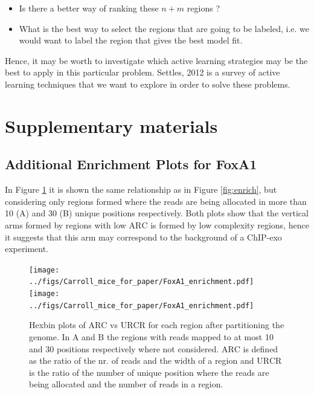 \documentclass[11pt]{article}\usepackage[]{graphicx}\usepackage[]{color}
\begin{document}
\begin{itemize}
\item Is there a better way of ranking these $n+m$ regions ?
\item What is the best way to select the regions that are going to be
  labeled, i.e. we would want to label the region that gives the
  best model fit.
\end{itemize}

Hence, it may be worth to investigate which active learning strategies
may be the best to apply in this particular problem. Settles, 2012
\cite{al} is a survey of active learning techniques that we want to
explore in order to solve these problems.

\newpage


\nocite{exo_review}
\nocite{exo_gb}
\nocite{maplot1}
\nocite{maplot2}
\nocite{esl}
\nocite{anp}
\nocite{al}
\nocite{oc_review}
\nocite{exo4}

\newpage

\section*{Supplementary materials}
\label{sec:supp}

\subsection*{Additional Enrichment Plots for FoxA1}
\label{sec:enrichsup}

In Figure \ref{fig:enrich2} it is shown the same relationship as in
Figure \ref{fig:enrich}, but considering only regions formed where the
reads are being allocated in more than 10 (A) and 30 (B) unique
positions respectively. Both plots show that the vertical arms formed
by regions with low $\mbox{ARC}$ is formed by low complexity regions,
hence it suggests that this arm may correspond to the background of a
ChIP-exo experiment.

\begin{figure}[h!]
  \centering
  \texttt{[image: ../figs/Carroll\_mice\_for\_paper/FoxA1\_enrichment.pdf]}
  \texttt{[image: ../figs/Carroll\_mice\_for\_paper/FoxA1\_enrichment.pdf]}
  \caption{Hexbin plots of $\mbox{ARC}$ vs $\mbox{URCR}$ for each
    region after partitioning the genome. In A and B the regions with
    reads mapped to at most 10 and 30 positions respectively where not
    considered. $\mbox{ARC}$ is defined as the ratio of the nr. of
    reads and the width of a region and $\mbox{URCR}$ is the ratio of
    the number of unique position where the reads are being allocated
    and the number of reads in a region.}
  \label{fig:enrich2}
\end{figure}
\end{document}
